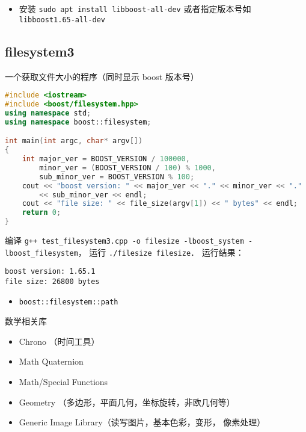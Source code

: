 
\begin{itemize}
\item 安装 \verb|sudo apt install libboost-all-dev| 或者指定版本号如 \verb|libboost1.65-all-dev|
\end{itemize}

\subsection{filesystem3}
一个获取文件大小的程序（同时显示 boost 版本号）
\begin{lstlisting}[language=cpp, caption=test_filesystem3.cpp]
#include <iostream>
#include <boost/filesystem.hpp>
using namespace std;
using namespace boost::filesystem;

int main(int argc, char* argv[])
{
	int major_ver = BOOST_VERSION / 100000,
        minor_ver = (BOOST_VERSION / 100) % 1000,
		sub_minor_ver = BOOST_VERSION % 100;
	cout << "boost version: " << major_ver << "." << minor_ver << "."
        << sub_minor_ver << endl;
	cout << "file size: " << file_size(argv[1]) << " bytes" << endl;
	return 0;
}
\end{lstlisting}

编译 \verb|g++ test_filesystem3.cpp -o filesize -lboost_system -lboost_filesystem|， 运行 \verb|./filesize filesize|． 运行结果：
\begin{lstlisting}[language=plain]
boost version: 1.65.1
file size: 26800 bytes
\end{lstlisting}

\begin{itemize}
\item \verb|boost::filesystem::path|
\end{itemize}

数学相关库
\begin{itemize}
\item Chrono （时间工具）
\item Math Quaternion
\item Math/Special Functions
\item Geometry （多边形，平面几何，坐标旋转，非欧几何等）
\item Generic Image Library（读写图片，基本色彩，变形， 像素处理）
\end{itemize}
